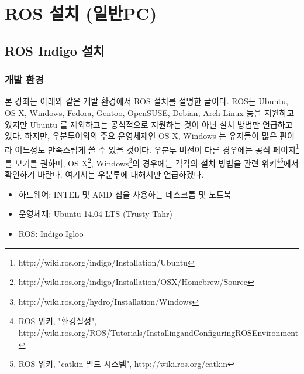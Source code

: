 
\chapter{ROS 설치 (일반PC)}

\section{ROS Indigo 설치}

\subsection{개발 환경}

본 강좌는 아래와 같은 개발 환경에서 ROS 설치를 설명한 글이다. ROS는 Ubuntu, OS X, Windows, Fedora, Gentoo, OpenSUSE, Debian, Arch Linux 등을 지원하고 있지만 Ubuntu 를 제외하고는 공식적으로 지원하는 것이 아닌 설치 방법만 언급하고 있다. 하지만, 우분투이외의 주요 운영체제인 OS X, Windows 는 유저들이 많은 편이라 어느정도 만족스럽게 쓸 수 있을 것이다. 우분투 버전이 다른 경우에는 공식 페이지\footnote{http://wiki.ros.org/indigo/Installation/Ubuntu}를 보기를 권하며, OS X\footnote{http://wiki.ros.org/indigo/Installation/OSX/Homebrew/Source}, Windows\footnote{http://wiki.ros.org/hydro/Installation/Windows}의 경우에는 각각의 설치 방법을 관련 위키\footnote{ROS 위키, "환경설정", http://wiki.ros.org/ROS/Tutorials/InstallingandConfiguringROSEnvironment}\footnote{ROS 위키, "catkin 빌드 시스템", http://wiki.ros.org/catkin}에서 확인하기 바란다. 여기서는 우분투에 대해서만 언급하겠다.

\begin{itemize}
\item 하드웨어: INTEL 및 AMD 칩을 사용하는 데스크톱 및 노트북 
\item 운영체제: Ubuntu 14.04 LTS (Trusty Tahr)
\item ROS: Indigo Igloo
\end{itemize}

